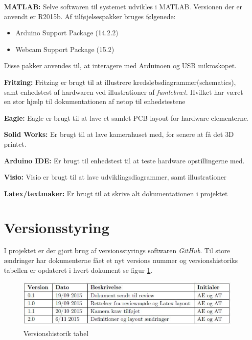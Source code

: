 \textbf{MATLAB:} Selve softwaren til systemet udvikles i MATLAB. Versionen der er anvendt er R2015b. Af tilføjelsespakker bruges følgenede:
\begin{itemize}
\item Arduino Support Package (14.2.2)
\item Webcam Support Package (15.2)
\end{itemize}
Disse pakker anvendes til, at interagere med Arduinoen og USB mikroskopet. 

\textbf{Fritzing:} Fritzing er brugt til at illustrere kredsløbsdiagrammer(schematics), samt enhedstest af hardwaren ved illustrationer af \textit{fumlebræt}. Hvilket har været en stor hjælp til dokumentationen af netop til enhedstestene 

\textbf{Eagle:} Eagle er brugt til at lave et samlet PCB layout for hardware elementerne.

\textbf{Solid Works:} Er brugt til at lave kamerahuset med, for senere at  få det 3D printet.

\textbf{Arduino IDE:} Er brugt til enhedstest til at teste hardware opstillingerne med. 

\textbf{Visio:} Visio er brugt til at lave udviklingsdiagrammer, samt illustrationer 

\textbf{Latex/textmaker:} Er brugt til at skrive alt dokumentationen i projektet


\section{Versionsstyring}
I projektet er der gjort brug af versionsstyrings softwaren \textit{GitHub}. Til store ændringer har dokumenterne fået et nyt versions nummer og versionshistoriks tabellen er opdateret i hvert dokument se figur \ref{fig:versionsh}. 

\begin{figure}[H]
	\centering
	\includegraphics[width=1\textwidth]{billeder/Hovedrapport/versionshis.JPG}
	\caption{Versionshistorik tabel}
	\label{fig:versionsh}
\end{figure}

